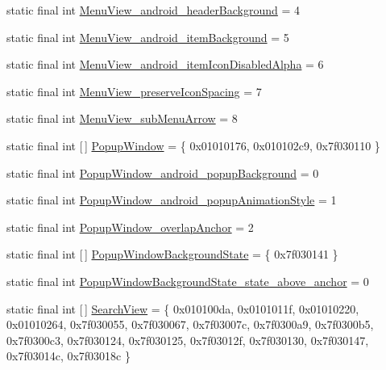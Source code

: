 \begin{DoxyCompactItemize}
\item 
static final int \mbox{\hyperlink{classcom_1_1google_1_1android_1_1gms_1_1R_1_1styleable_a1c848baac69209c60a3b81d49a7199ba}{Menu\+View\+\_\+android\+\_\+header\+Background}} = 4
\item 
static final int \mbox{\hyperlink{classcom_1_1google_1_1android_1_1gms_1_1R_1_1styleable_a29f4c14c7135127c233bb301766720ae}{Menu\+View\+\_\+android\+\_\+item\+Background}} = 5
\item 
static final int \mbox{\hyperlink{classcom_1_1google_1_1android_1_1gms_1_1R_1_1styleable_afbb97169190e6659fb34f221bc1397ea}{Menu\+View\+\_\+android\+\_\+item\+Icon\+Disabled\+Alpha}} = 6
\item 
static final int \mbox{\hyperlink{classcom_1_1google_1_1android_1_1gms_1_1R_1_1styleable_ab50d59133ff75dfce2c26f640d6571d8}{Menu\+View\+\_\+preserve\+Icon\+Spacing}} = 7
\item 
static final int \mbox{\hyperlink{classcom_1_1google_1_1android_1_1gms_1_1R_1_1styleable_aa4db522f3f91abde978c3477d9f499ce}{Menu\+View\+\_\+sub\+Menu\+Arrow}} = 8
\item 
static final int \mbox{[}$\,$\mbox{]} \mbox{\hyperlink{classcom_1_1google_1_1android_1_1gms_1_1R_1_1styleable_aa3c6c4ecdca900ea2127b321fc999255}{Popup\+Window}} = \{ 0x01010176, 0x010102c9, 0x7f030110 \}
\item 
static final int \mbox{\hyperlink{classcom_1_1google_1_1android_1_1gms_1_1R_1_1styleable_ae9a96835592cfb13092491b3417f0f99}{Popup\+Window\+\_\+android\+\_\+popup\+Background}} = 0
\item 
static final int \mbox{\hyperlink{classcom_1_1google_1_1android_1_1gms_1_1R_1_1styleable_a579973cf5988688047ad270eca57df4b}{Popup\+Window\+\_\+android\+\_\+popup\+Animation\+Style}} = 1
\item 
static final int \mbox{\hyperlink{classcom_1_1google_1_1android_1_1gms_1_1R_1_1styleable_aaae1b129a0f301ad26617142260158d8}{Popup\+Window\+\_\+overlap\+Anchor}} = 2
\item 
static final int \mbox{[}$\,$\mbox{]} \mbox{\hyperlink{classcom_1_1google_1_1android_1_1gms_1_1R_1_1styleable_a5c714ea1a97d3d130c1fbe053cee92f6}{Popup\+Window\+Background\+State}} = \{ 0x7f030141 \}
\item 
static final int \mbox{\hyperlink{classcom_1_1google_1_1android_1_1gms_1_1R_1_1styleable_a36279b4e674046f1337342a2cf523ece}{Popup\+Window\+Background\+State\+\_\+state\+\_\+above\+\_\+anchor}} = 0
\item 
static final int \mbox{[}$\,$\mbox{]} \mbox{\hyperlink{classcom_1_1google_1_1android_1_1gms_1_1R_1_1styleable_a6e6702082893eb4015c0a9477c384f78}{Search\+View}} = \{ 0x010100da, 0x0101011f, 0x01010220, 0x01010264, 0x7f030055, 0x7f030067, 0x7f03007c, 0x7f0300a9, 0x7f0300b5, 0x7f0300c3, 0x7f030124, 0x7f030125, 0x7f03012f, 0x7f030130, 0x7f030147, 0x7f03014c, 0x7f03018c \}

\end{DoxyCompactItemize}
